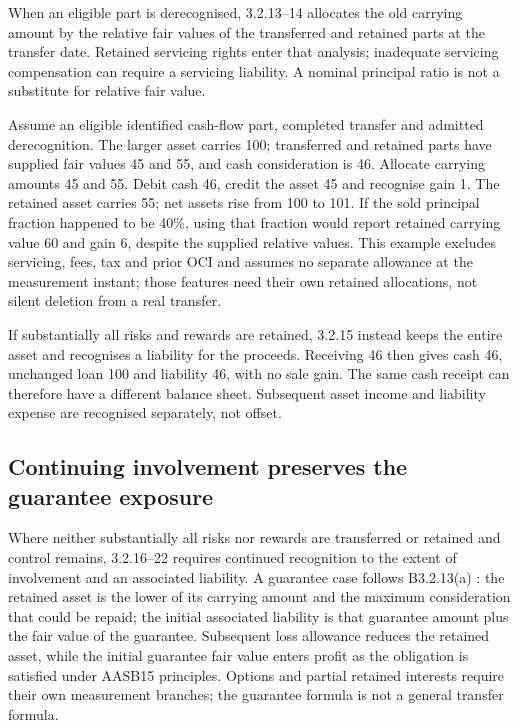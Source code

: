 When an eligible part is derecognised, 3.2.13--14 allocates the old carrying amount by the relative fair values of the transferred and retained parts at the transfer date. Retained servicing rights enter that analysis; inadequate servicing compensation can require a servicing liability. A nominal principal ratio is not a substitute for relative fair value.

Assume an eligible identified cash-flow part, completed transfer and admitted derecognition. The larger asset carries 100; transferred and retained parts have supplied fair values 45 and 55, and cash consideration is 46. Allocate carrying amounts 45 and 55. Debit cash 46, credit the asset 45 and recognise gain 1. The retained asset carries 55; net assets rise from 100 to 101. If the sold principal fraction happened to be 40\%, using that fraction would report retained carrying value 60 and gain 6, despite the supplied relative values. This example excludes servicing, fees, tax and prior OCI and assumes no separate allowance at the measurement instant; those features need their own retained allocations, not silent deletion from a real transfer.

If substantially all risks and rewards are retained, 3.2.15 instead keeps the entire asset and recognises a liability for the proceeds. Receiving 46 then gives cash 46, unchanged loan 100 and liability 46, with no sale gain. The same cash receipt can therefore have a different balance sheet. Subsequent asset income and liability expense are recognised separately, not offset.

\hypertarget{continuing-involvement-preserves-the-guarantee-exposure}{%
\subsection{Continuing involvement preserves the guarantee exposure}\label{continuing-involvement-preserves-the-guarantee-exposure}}

Where neither substantially all risks nor rewards are transferred or retained and control remains, 3.2.16--22 requires continued recognition to the extent of involvement and an associated liability. A guarantee case follows B3.2.13(a) \citep[B3.2.13(a)]{aasb9dated}: the retained asset is the lower of its carrying amount and the maximum consideration that could be repaid; the initial associated liability is that guarantee amount plus the fair value of the guarantee. Subsequent loss allowance reduces the retained asset, while the initial guarantee fair value enters profit as the obligation is satisfied under AASB15 principles. Options and partial retained interests require their own measurement branches; the guarantee formula is not a general transfer formula.

